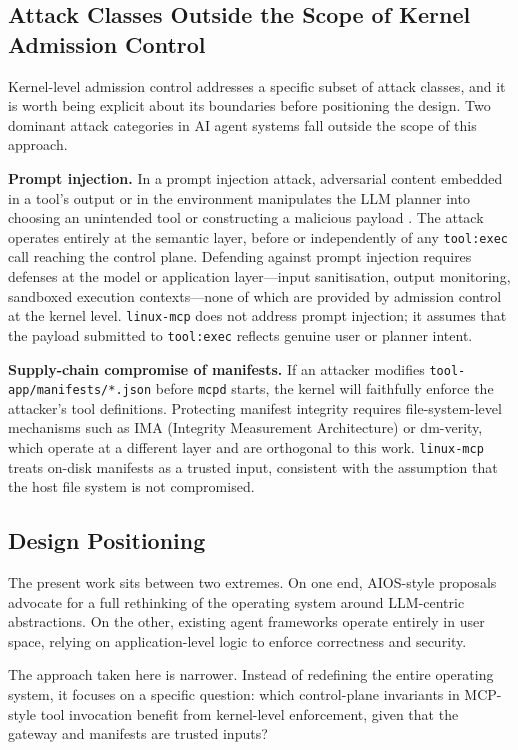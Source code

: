 \subsection{Attack Classes Outside the Scope of Kernel Admission Control}
\label{sec:attack-scope}

Kernel-level admission control addresses a specific subset of attack classes, and it is worth being explicit about its boundaries before positioning the design.
Two dominant attack categories in AI agent systems fall outside the scope of this approach.

\textbf{Prompt injection.}
In a prompt injection attack, adversarial content embedded in a tool's output or in the environment manipulates the LLM planner into choosing an unintended tool or constructing a malicious payload \cite{greshake2023prompt, liu2023prompt}.
The attack operates entirely at the semantic layer, before or independently of any \texttt{tool:exec} call reaching the control plane.
Defending against prompt injection requires defenses at the model or application layer---input sanitisation, output monitoring, sandboxed execution contexts---none of which are provided by admission control at the kernel level.
\texttt{linux-mcp} does not address prompt injection; it assumes that the payload submitted to \texttt{tool:exec} reflects genuine user or planner intent.

\textbf{Supply-chain compromise of manifests.}
If an attacker modifies \texttt{tool-app/manifests/*.json} before \texttt{mcpd} starts, the kernel will faithfully enforce the attacker's tool definitions.
Protecting manifest integrity requires file-system-level mechanisms such as IMA (Integrity Measurement Architecture) or dm-verity, which operate at a different layer and are orthogonal to this work.
\texttt{linux-mcp} treats on-disk manifests as a trusted input, consistent with the assumption that the host file system is not compromised.

\subsection{Design Positioning}

The present work sits between two extremes.
On one end, AIOS-style proposals advocate for a full rethinking of the operating system around LLM-centric abstractions.
On the other, existing agent frameworks operate entirely in user space, relying on application-level logic to enforce correctness and security.

The approach taken here is narrower.
Instead of redefining the entire operating system, it focuses on a specific question: which control-plane invariants in MCP-style tool invocation benefit from kernel-level enforcement, given that the gateway and manifests are trusted inputs?


